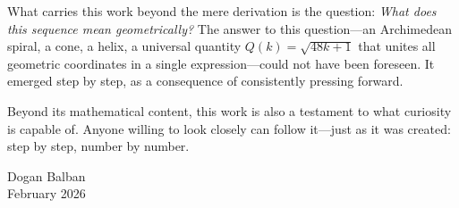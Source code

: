 What carries this work beyond the mere derivation is the question:
\emph{What does this sequence mean geometrically?} The answer to this
question---an Archimedean spiral, a cone, a helix, a universal quantity
$Q(k) = \sqrt{48k+1}$ that unites all geometric coordinates in a single
expression---could not have been foreseen. It emerged step by step, as a
consequence of consistently pressing forward.

\medskip

Beyond its mathematical content, this work is also a testament to what
curiosity is capable of. Anyone willing to look closely can follow it---just
as it was created: step by step, number by number.

\bigskip

\noindent Dogan Balban\\
\noindent February 2026
